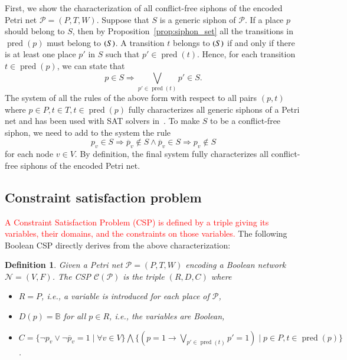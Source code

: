 \documentclass[preprint,12pt]{elsarticle}
\newtheorem{definition}{Definition}[section]
\newcommand{\change}[1]{\textcolor{red}{#1}}
\DeclareMathOperator{\pred}{pred}
\let\succ\relax
\DeclareMathOperator{\succ}{succ}
\begin{document}
First, we show the characterization of all conflict-free siphons of the encoded Petri net \(\mathcal{P} = (P, T, W)\).
Suppose that \(S\) is a generic siphon of \(\mathcal{P}\). If a place \(p\) should belong to \(S\), then by Proposition~\ref{prop:siphon_set} all the transitions in \(\pred(p)\) must belong to \(\succ(S)\).
A transition \(t\) belongs to \(\succ(S)\) if and only if there is at least one place \(p'\) in \(S\) such that \(p' \in \pred(t)\).
Hence, for each transition \(t \in \pred(p)\), we can state that
\begin{equation}
\label{eq:siphon}
p \in S \Rightarrow \bigvee_{p' \in \pred(t)}p' \in S.
\end{equation}
The system of all the rules of the above form with respect to all pairs \((p, t)\) where \(p \in P, t \in T, t \in \pred(p)\) fully characterizes all generic siphons of a Petri net and has been used with SAT solvers in~\cite{oanea2010new,nabli2016enumerating}.
To make \(S\) to be a conflict-free siphon, we need to add to the system the rule
\begin{equation}
\label{eq:conflict}
p_v \in S \Rightarrow \overline{p}_v \not \in S \wedge \overline{p}_v \in S \Rightarrow p_v \not \in S
\end{equation}for each node \(v \in V\).
By definition, the final system fully characterizes all conflict-free siphons of the encoded Petri net.

\subsection{Constraint satisfaction problem}%
\label{subsec:computation_csp}

\change{A Constraint Satisfaction Problem (CSP) is defined by a triple giving its variables, their domains, and the constraints on those variables.}
The following Boolean CSP directly derives from the above characterization:
\begin{definition}

  Given a Petri net \(\mathcal{P} = (P, T, W)\) encoding a Boolean network \(\mathcal{N} = (V, F)\).
  The CSP \(\mathcal{C}(\mathcal{P})\) is the triple \((R, D, C)\) where
  \begin{itemize}%
    \item \(R = P\), i.e., a variable is introduced for each place of \(\mathcal{P}\),
    \item \(D(p) = \mathbb{B}\) for all \(p \in R\), i.e., the variables are Boolean,
    \item \(C = \{\neg p_v \vee \neg \overline{p}_v = 1 \mid \forall v \in V\} \bigwedge
\{(p = 1 \rightarrow \bigvee_{p' \in \pred(t)}p' = 1) \mid p \in P, t \in \pred(p)\}\).
  \end{itemize}

\end{definition}
\end{document}
